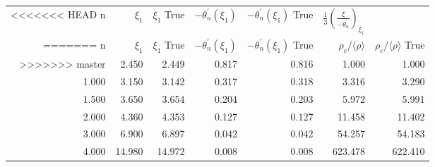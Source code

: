 \begin{tabular}{rrrrrrr}
\toprule
<<<<<<< HEAD
    n &  $\xi_1$ &  $\xi_1$ True &  $-\theta_n^\prime(\xi_1)$ &  $-\theta_n^\prime(\xi_1)$ True &  $\frac{1}{3}\left(\frac{\xi}{-\theta_n^\prime}\right)_{\xi_1}$ \\
=======
    n &  $\xi_1$ &  $\xi_1$ True &  $-\theta_n^\prime(\xi_1)$ &  $-\theta_n^\prime(\xi_1)$ True &  $\rho_c/\langle\rho\rangle$ &  $\rho_c/\langle\rho\rangle$ True \\
>>>>>>> master
\midrule
0.000 &    2.450 &         2.449 &                      0.817 &                           0.816 &                        1.000 &                             1.000 \\
1.000 &    3.150 &         3.142 &                      0.317 &                           0.318 &                        3.316 &                             3.290 \\
1.500 &    3.650 &         3.654 &                      0.204 &                           0.203 &                        5.972 &                             5.991 \\
2.000 &    4.360 &         4.353 &                      0.127 &                           0.127 &                       11.458 &                            11.402 \\
3.000 &    6.900 &         6.897 &                      0.042 &                           0.042 &                       54.257 &                            54.183 \\
4.000 &   14.980 &        14.972 &                      0.008 &                           0.008 &                      623.478 &                           622.410 \\
\bottomrule
\end{tabular}
